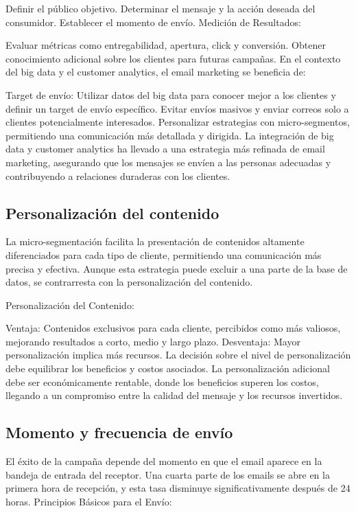 \documentclass[
    a4paper, %
    10pt, %
    unnumberedsections, %
    twoside, %
]{LTJournalArticle}
\begin{document}
Definir el público objetivo.
Determinar el mensaje y la acción deseada del consumidor.
Establecer el momento de envío.
Medición de Resultados:

Evaluar métricas como entregabilidad, apertura, click y conversión.
Obtener conocimiento adicional sobre los clientes para futuras campañas.
En el contexto del big data y el customer analytics, el email marketing se beneficia de:

Target de envío:
Utilizar datos del big data para conocer mejor a los clientes y definir un target de envío específico.
Evitar envíos masivos y enviar correos solo a clientes potencialmente interesados.
Personalizar estrategias con micro-segmentos, permitiendo una comunicación más detallada y dirigida.
La integración de big data y customer analytics ha llevado a una estrategia más refinada de email marketing, asegurando que los mensajes se envíen a las personas adecuadas y contribuyendo a relaciones duraderas con los clientes.



\subsection{Personalización del contenido}

La micro-segmentación facilita la presentación de contenidos altamente diferenciados para cada tipo de cliente, permitiendo una comunicación más precisa y efectiva. Aunque esta estrategia puede excluir a una parte de la base de datos, se contrarresta con la personalización del contenido.

Personalización del Contenido:

Ventaja: Contenidos exclusivos para cada cliente, percibidos como más valiosos, mejorando resultados a corto, medio y largo plazo.
Desventaja: Mayor personalización implica más recursos.
La decisión sobre el nivel de personalización debe equilibrar los beneficios y costos asociados. La personalización adicional debe ser económicamente rentable, donde los beneficios superen los costos, llegando a un compromiso entre la calidad del mensaje y los recursos invertidos.


\subsection{Momento y frecuencia de envío}


El éxito de la campaña depende del momento en que el email aparece en la bandeja de entrada del receptor.
Una cuarta parte de los emails se abre en la primera hora de recepción, y esta tasa disminuye significativamente después de 24 horas.
Principios Básicos para el Envío:
\end{document}
